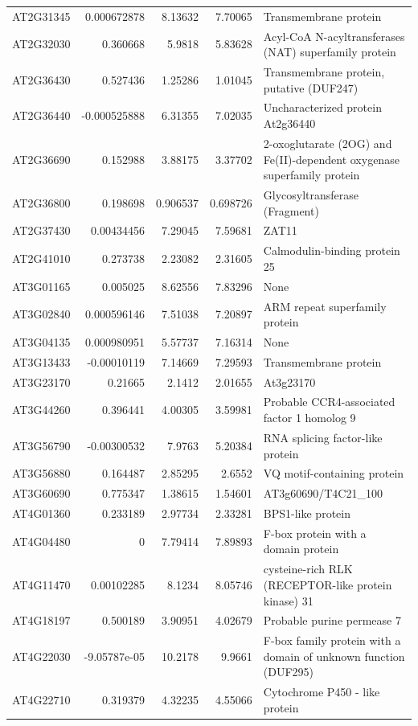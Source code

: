 \documentclass[11pt]{article}
\begin{document}
\begin{center}
\begin{tabular}{lrrrl}
AT2G31345 & 0.000672878 & 8.13632 & 7.70065 & Transmembrane protein\\
AT2G32030 & 0.360668 & 5.9818 & 5.83628 & Acyl-CoA N-acyltransferases (NAT) superfamily protein\\
AT2G36430 & 0.527436 & 1.25286 & 1.01045 & Transmembrane protein, putative (DUF247)\\
AT2G36440 & -0.000525888 & 6.31355 & 7.02035 & Uncharacterized protein At2g36440\\
AT2G36690 & 0.152988 & 3.88175 & 3.37702 & 2-oxoglutarate (2OG) and Fe(II)-dependent oxygenase superfamily protein\\
AT2G36800 & 0.198698 & 0.906537 & 0.698726 & Glycosyltransferase (Fragment)\\
AT2G37430 & 0.00434456 & 7.29045 & 7.59681 & ZAT11\\
AT2G41010 & 0.273738 & 2.23082 & 2.31605 & Calmodulin-binding protein 25\\
AT3G01165 & 0.005025 & 8.62556 & 7.83296 & None\\
AT3G02840 & 0.000596146 & 7.51038 & 7.20897 & ARM repeat superfamily protein\\
AT3G04135 & 0.000980951 & 5.57737 & 7.16314 & None\\
AT3G13433 & -0.00010119 & 7.14669 & 7.29593 & Transmembrane protein\\
AT3G23170 & 0.21665 & 2.1412 & 2.01655 & At3g23170\\
AT3G44260 & 0.396441 & 4.00305 & 3.59981 & Probable CCR4-associated factor 1 homolog 9\\
AT3G56790 & -0.00300532 & 7.9763 & 5.20384 & RNA splicing factor-like protein\\
AT3G56880 & 0.164487 & 2.85295 & 2.6552 & VQ motif-containing protein\\
AT3G60690 & 0.775347 & 1.38615 & 1.54601 & AT3g60690/T4C21\_100\\
AT4G01360 & 0.233189 & 2.97734 & 2.33281 & BPS1-like protein\\
AT4G04480 & 0 & 7.79414 & 7.89893 & F-box protein with a domain protein\\
AT4G11470 & 0.00102285 & 8.1234 & 8.05746 & cysteine-rich RLK (RECEPTOR-like protein kinase) 31\\
AT4G18197 & 0.500189 & 3.90951 & 4.02679 & Probable purine permease 7\\
AT4G22030 & -9.05787e-05 & 10.2178 & 9.9661 & F-box family protein with a domain of unknown function (DUF295)\\
AT4G22710 & 0.319379 & 4.32235 & 4.55066 & Cytochrome P450 - like protein\\

\end{tabular}
\end{center}
\end{document}
